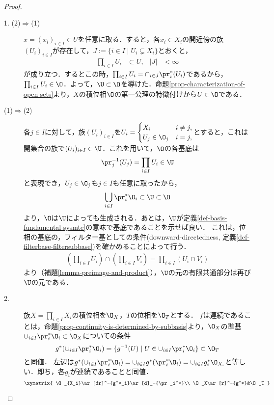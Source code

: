\documentclass[uplatex,dvipdfmx]{jsreport}
\begin{document}
\begin{proof}\mbox{}
    \begin{description}
        \item[1. (2)$\Rightarrow$(1)] 
        $x=(x_i)_{i\in I}\in U$を任意に取る．すると，各$x_i\in X_i$の開近傍の族$(U_i)_{i\in I}$が存在して，$J:=\{i\in I\mid U_i\subsetneq X_i\}$とおくと，\begin{align*}
            \prod_{i\in I}U_i&\subset U,&|J|&<\infty
        \end{align*}
        が成り立つ．するとこの時，$\prod_{i\in I}U_i=\cap_{i\in J}\pr^*_i(U_i)$であるから，$\prod_{i\in I}U_i\in\O$．よって，$\U\subset\O$を導けた．命題\ref{prop-characterization-of-open-sets}より，$X$の積位相$\O$の第一公理の特徴付けから$U\in\O$である．
        \item[(1)$\Rightarrow$(2)]
        各$j\in I$に対して，族$(U_i)_{i\in I}$を$U_i=\begin{cases}
            X_i&i\ne j,\\
            U_j\in\O_j&i=j,
        \end{cases}$とすると，これは開集合の族で$(U_i)_{i\in I}\in\U$．これを用いて，$\O$の各基底は
        \[\pr^{-1}_{j}(U_j)=\prod_{i\in I}U_i\in\U\]
        と表現でき，$U_j\in\O_j$も$j\in I$も任意に取ったから，
        \[\bigcup_{i\in I}\pr^*_i\O_i\subset\U\subset\O\]
        より，$\O$は$\U$によっても生成される．あとは，$\U$が定義\ref{def-basis-fundamental-sysmte}の意味で基底であることを示せば良い．
        これは，位相の基底の，フィルター基としての条件(downward-directedness, 定義\ref{def-filterbase-filtersubbase})を確かめることによって行う．
        \begin{align*}
            (\prod_{i\in I}U_i)\cap(\prod_{i\in I}V_i)=\prod_{i\in I}(U_i\cap V_i)
        \end{align*}
        より（補題\ref{lemma-preimage-and-product}），$\U$の元の有限共通部分は再び$\U$の元である．
        \item[2.]
        族$X=\prod_{i\in I}X_i$の積位相を$\O_X$，$T$の位相を$\O_T$とする．
        $f$は連続であることは，命題\ref{prop-continuity-is-determined-by-subbasis}より，$\O_X$の準基$\cup_{i\in I}\pr^*_i\O_i\subset\O_X$についての条件
        \[g^*(\cup_{i\in I}\pr^*_i\O_i)=\{g^{-1}(U)\mid U\in\cup_{i\in I}\pr^*_i\O_i\}\subset\O_T\]
        と同値．
        左辺は$g^*(\cup_{i\in I}\pr^*_i\O_i)=\cup_{i\in I}g^*(\pr^*_i\O_i)=\cup_{i\in I}g^*_i\O_{X_i}$と等しい．即ち，各$g_i$が連続であることと同値．
        \[\xymatrix{
            \O_{X_i}\ar[dr]^-{g^*_i}\ar[d]_-{\pr_i^*}\\
            \O_X\ar[r]^-{g^*}&\O_T
        }\]
    \end{description}
\end{proof}
\end{document}
